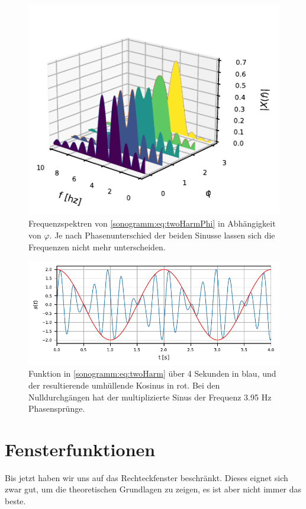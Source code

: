 \begin{figure}
    \centering
    \includegraphics{papers/sonogramm/images/twoharmphasedifff.pdf}
    \caption{Frequenzspektren von \eqref{sonogramm:eq:twoHarmPhi} in Abhängigkeit von $\varphi$.
    Je nach Phasenunterschied der beiden Sinusse lassen sich die Frequenzen nicht mehr unterscheiden.
    \label{sonogramm:freqdiffdemo}
    }
\end{figure}

\begin{figure}
    \centering
    \includegraphics{papers/sonogramm/images/twoharmTime.pdf}
    \caption{Funktion in \eqref{sonogramm:eq:twoHarm} über 4 Sekunden in blau, und der resultierende
    umhüllende Kosinus in rot.
    Bei den Nulldurchgängen hat der multiplizierte Sinus der Frequenz 3.95 Hz Phasensprünge.
    \label{sonogramm:twoHarmTime}
    }
\end{figure}

\section{Fensterfunktionen}
\label{sonogramm:section:windows}
Bis jetzt haben wir uns auf das Rechteckfenster beschränkt.
Dieses eignet sich zwar gut, um die theoretischen Grundlagen zu zeigen,
es ist aber nicht immer das beste.

